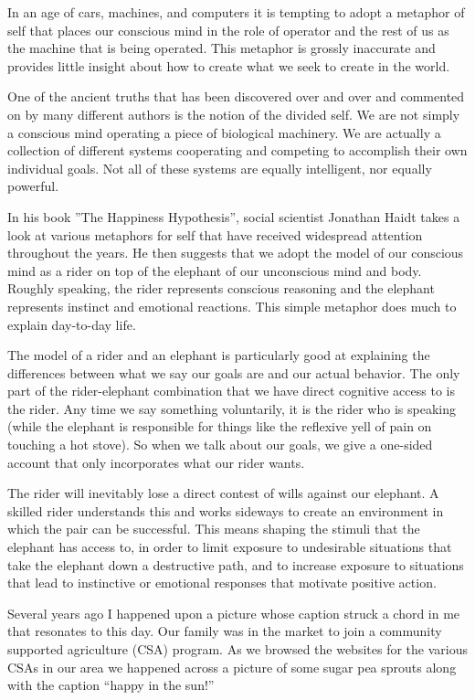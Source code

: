 \documentclass[ebook,12pt,openany,twoside]{memoir}
\begin{document}
In an age of cars, machines, and computers it is tempting to adopt a metaphor
of self that places our conscious mind in the role of operator and the rest of
us as the machine that is being operated. This metaphor is grossly inaccurate
and provides little insight about how to create what we seek to create in the
world.

One of the ancient truths that has been discovered over and over and commented
on by many different authors is the notion of the divided self. We are not
simply a conscious mind operating a piece of biological machinery. We are
actually a collection of different systems cooperating and competing to
accomplish their own individual goals. Not all of these systems are equally
intelligent, nor equally powerful.

In his book ''The Happiness Hypothesis'', social scientist Jonathan Haidt takes
a look at various metaphors for self that have received widespread attention
throughout the years. He then suggests that we adopt the model of our conscious
mind as a rider on top of the elephant of our unconscious mind and body.
Roughly speaking, the rider represents conscious reasoning and the elephant
represents instinct and emotional reactions. This simple metaphor does much to
explain day-to-day life.

The model of a rider and an elephant is particularly good at explaining the
differences between what we say our goals are and our actual behavior. The only
part of the rider-elephant combination that we have direct cognitive access to
is the rider. Any time we say something voluntarily, it is the rider who is
speaking (while the elephant is responsible for things like the reflexive yell
of pain on touching a hot stove). So when we talk about our goals, we give a
one-sided account that only incorporates what our rider wants.

The rider will inevitably lose a direct contest of wills against our elephant.
A skilled rider understands this and works sideways to create an environment in
which the pair can be successful. This means shaping the stimuli that the
elephant has access to, in order to limit exposure to undesirable situations
that take the elephant down a destructive path, and to increase exposure to
situations that lead to instinctive or emotional responses that motivate
positive action.

Several years ago I happened upon a picture whose caption struck a chord in me
that resonates to this day. Our family was in the market to join a community
supported agriculture (CSA) program. As we browsed the websites for the various
CSAs in our area we happened across a picture of some sugar pea sprouts along
with the caption ``happy in the sun!''
\end{document}
